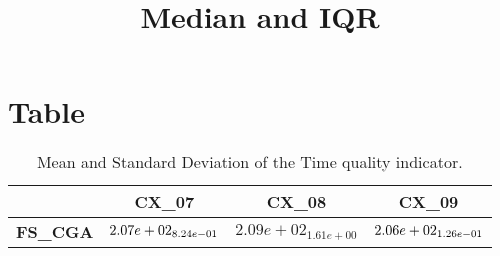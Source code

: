 \documentclass{article}
\title{Median and IQR}
\author{}
\begin{document}
\maketitle
\section{Table}
\begin{table}[!htp]
  \caption{Mean and Standard Deviation of the Time quality indicator.}
  \label{table:Time}
  \centering
  \begin{scriptsize}
  \begin{tabular}{c|ccc}
      & \textbf{CX\_07} & \textbf{CX\_08} & \textbf{CX\_09} \\\hline
      \textbf{FS_CGA} & $\cellcolor{gray95} 2.07e+02_{8.24e-01} $ & $ 2.09e+02_{1.61e+00} $ & $ \cellcolor{gray25} 2.06e+02_{1.26e-01}$ \\
  \end{tabular}
  \end{scriptsize}
\end{table}
\end{document}
